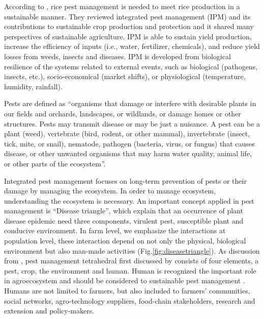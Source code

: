 According to \citet{Savary:2006to}, rice pest management is needed to meet rice production in a sustainable manner. They reviewed integrated pest management (IPM) and its contributions to sustainable crop production and protection and it shared many perspectives of sustainable agriculture. IPM is able to sustain yield production, increase the efficiency of inputs (i.e., water, fertilizer, chemicals), and reduce yield losses from weeds, insects and diseases. IPM is developed from biological resilience of the systems related to external events, such as biological (pathogens, insects, etc.), socio-economical (market shifts), or physiological (temperature, humidity, rainfall). 

Pests are defined as ``organisms that damage or interfere with desirable plants in our fields and orchards, landscapes, or wildlands, or damage homes or other structures. Pests may transmit disease or may be just a nuisance. A pest can be a plant (weed), vertebrate (bird, rodent, or other mammal), invertebrate (insect, tick, mite, or snail), nematode, pathogen (bacteria, virus, or fungus) that causes disease, or other unwanted organisms that may harm water quality, animal life, or other parts of the ecosystem''.

Integrated pest management focuses on long-term prevention of pests or their damage by managing the ecosystem. In order to manage ecosystem, understanding the ecosystem is necessary. An important concept applied in pest management is ``Disease triangle'', which explain that an occurrence of plant disease epidemic need three components, virulent pest, susceptible plant and conducive environment. In farm level, we emphasize the interactions at population level, these interaction depend on not only the physical, biological environment but also man-made activities (Fig.\ref{fig:diseasetriangle}). As discussion from \citet{Savary:2006to}, pest management tetrahedral first discussed by \cite{Zadoks:1979ts} consists of four elements, a pest, crop, the environment and human. Human is recognized the important role in agroecosystem and should be considered to sustainable pest management \citep{Zadok1985}. Humans are not limited to farmers, but also included to farmers’ communities, social networks, agro-technology  suppliers,  food-chain  stakeholders,  research  and extension and policy-makers.

